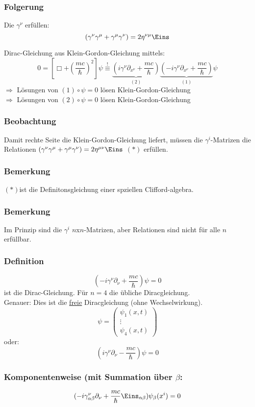 \documentclass[twoside,a4paper]{scrartcl}
\renewcommand{\1}{\mathds{1}}
\newcommand{\Ra}{\Rightarrow}
\begin{document}
\subsubsection*{Folgerung}
Die $\gamma^\nu$ erfüllen:
$$(\gamma^\nu\gamma^\mu+\gamma^\mu\gamma^\nu)=2 \eta^{\nu\mu}\Eins$$

% 

Dirac-Gleichung aus Klein-Gordon-Gleichung mittels:
$$0=[\Box+(\frac{mc}{\hbar})^2]\psi\stackrel{!}{\equiv}\underbrace{(i\gamma^\nu\partial_{x^\nu}+\frac{mc}{\hbar})}_{(2)}\underbrace{(-i\gamma^\nu\partial_{x^\nu}+\frac{mc}{\hbar})}_{(1)}\psi $$
$\Ra$ Lösungen von $(1)\circ \psi=0$ lösen Klein-Gordon-Gleichung\\
$\Ra$ Lösungen von $(2)\circ \psi=0$ lösen Klein-Gordon-Gleichung
\subsubsection*{Beobachtung}
Damit rechte Seite die Klein-Gordon-Gleichung liefert, müssen die $\gamma^i$-Matrizen die Relationen $(\gamma^\nu\gamma^\mu+\gamma^\mu\gamma^\nu)=2 \eta^{\mu\nu}\Eins$ $(*)$ erfüllen.
\subsubsection*{Bemerkung}
$(*)$ist die Definitonsgleichung einer spziellen Clifford-algebra.
\subsubsection*{Bemerkung}
Im Prinzip sind die $\gamma^i$ $n$x$n$-Matrizen, aber Relationen sind nicht für alle $n$ erfüllbar.
\subsubsection*{Definition}
$$(-i\gamma^\nu\partial_\nu+\frac{mc}{\hbar})\psi=0$$
ist die Dirac-Gleichung. Für $n=4$ die übliche Diracgleichung.\\
Genauer: Dies ist die \underline{freie} Diracgleichung (ohne Wechselwirkung).
$$\psi=\begin{pmatrix} \psi_1(x,t) \\ \vdots \\ \psi_4(x,t)\end{pmatrix}$$
oder: $$(i\gamma^\nu\partial_\nu-\frac{mc}{\hbar})\psi=0$$
\subsubsection*{Komponentenweise (mit Summation über $\beta$:}
$$(-i\gamma^\nu_{\alpha\beta}\partial_\nu+\frac{mc}{\hbar} \Eins_{\alpha\beta})\psi_\beta(x^i)=0$$
\end{document}

